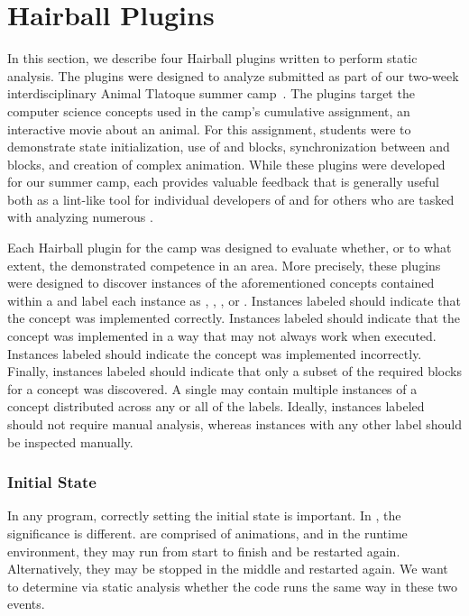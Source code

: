 \section{Hairball Plugins} 
In this section, we describe four Hairball plugins written to perform
\sprogram{} static analysis.  The plugins were designed to analyze 
submitted as part of our two-week interdisciplinary Animal Tlatoque summer
camp~\cite{Franklin:2013:SBO}. The plugins target the computer science concepts
used in the camp's cumulative assignment, an interactive movie about an
animal. For this assignment, students were to demonstrate state initialization,
use of \broadcast{} and \receive{} blocks, synchronization between \say{} and
\playsound{} blocks, and creation of complex animation. While these plugins
were developed for our summer camp, each provides valuable feedback that is
generally useful both as a lint-like tool for individual developers of
 and for others who are tasked with analyzing numerous
.

Each Hairball plugin for the camp was designed to evaluate whether, or to what
extent, the \sprogram{} demonstrated competence in an area. More precisely,
these plugins were designed to discover instances of the aforementioned
concepts contained within a \sprogram{} and label each instance as \correct{},
\semincor{}, \incor{}, or \incom{}. Instances labeled \correct{} should
indicate that the concept was implemented correctly. Instances labeled
\semincor{} should indicate that the concept was implemented in a way that may
not always work when executed. Instances labeled \incor{} should indicate the
concept was implemented incorrectly. Finally, instances labeled \incom{} should
indicate that only a subset of the required blocks for a concept was
discovered. A single \sprogram{} may contain multiple instances of a concept
distributed across any or all of the labels. Ideally, instances labeled
\correct{} should not require manual analysis, whereas instances with any other
label should be inspected manually.


\subsubsection{Initial State}
In any program, correctly setting the initial state is important.  In
, the significance is different.   are comprised of
animations, and in the runtime environment, they may run from start to finish
and be restarted again.  Alternatively, they may be stopped in the middle and
restarted again.  We want to determine via static analysis whether the code
runs the same way in these two events.

